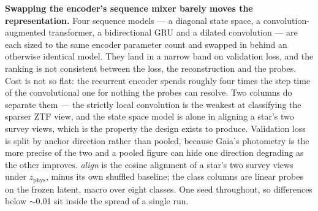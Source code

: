 \documentclass{article}
\newcommand{\zphys}{z_{\mathrm{phys}}}
\begin{document}
\begin{table}[h]
  \centering
  \footnotesize
  
  \caption{\textbf{Swapping the encoder's sequence mixer barely moves the
  representation.}
  Four sequence models --- a diagonal state space, a convolution-augmented
  transformer, a bidirectional GRU and a dilated convolution --- are each sized
  to the same encoder parameter count and swapped in behind an otherwise
  identical model.
  They land in a narrow band on validation loss, and the ranking is not
  consistent between the loss, the reconstruction and the probes.
  Cost is not so flat: the recurrent encoder spends roughly four times the step
  time of the convolutional one for nothing the probes can resolve.
  Two columns do separate them --- the strictly local convolution is the
  weakest at classifying the sparser ZTF view, and the state space model is
  alone in aligning a star's two survey views, which is the property the design
  exists to produce.
  Validation loss is split by anchor direction rather than pooled, because
  Gaia's photometry is the more precise of the two and a pooled figure can hide
  one direction degrading as the other improves.
  \emph{align} is the cosine alignment of a star's two survey views under
  $\zphys$, minus its own shuffled baseline; the class columns are linear
  probes on the frozen latent, macro over eight classes.
  One seed throughout, so differences below $\sim$0.01 sit inside the spread of
  a single run.}
  \label{tab:encoders}
\end{table}
\end{document}
